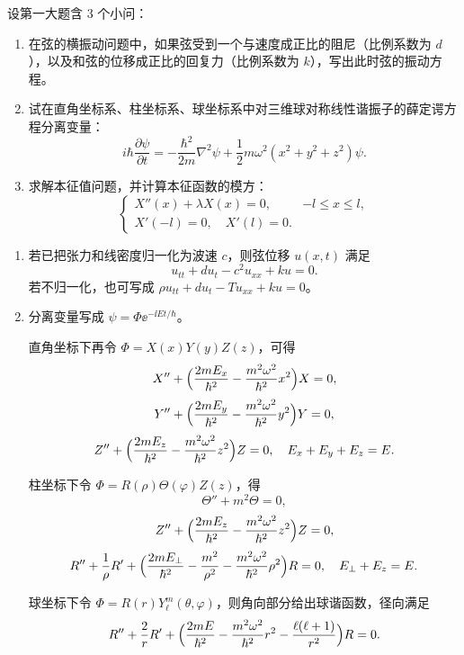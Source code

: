 ﻿

\begin{question}[简单计算和回答]

设第一大题含 3 个小问：
\begin{enumerate}[label=(\arabic*),leftmargin=2.6em,itemsep=0.25em,topsep=0.2em]
\item 在弦的横振动问题中，如果弦受到一个与速度成正比的阻尼（比例系数为 $d$），以及和弦的位移成正比的回复力（比例系数为 $k$），写出此时弦的振动方程。
\item 试在直角坐标系、柱坐标系、球坐标系中对三维球对称线性谐振子的薛定谔方程分离变量：
\[
 i\hbar\frac{\partial \psi}{\partial t}=-\frac{\hbar^2}{2m}\nabla^2\psi+\frac12 m\omega^2(x^2+y^2+z^2)\psi.
\]
\item 求解本征值问题，并计算本征函数的模方：
\[
\begin{cases}
X''(x)+\lambda X(x)=0, & -l\le x\le l,\\
X'(-l)=0,\quad X'(l)=0.
\end{cases}
\]
\end{enumerate}

\begin{solution}

\begin{enumerate}[label=(\arabic*),leftmargin=2.6em,itemsep=0.25em,topsep=0.2em]
\item 若已把张力和线密度归一化为波速 $c$，则弦位移 $u(x,t)$ 满足
\[
 u_{tt}+d u_t-c^2u_{xx}+ku=0.
\]
若不归一化，也可写成 $\rho u_{tt}+d u_t-Tu_{xx}+ku=0$。

\item 分离变量写成 $\psi=\Phi \ee^{-\ii Et/\hbar}$。

直角坐标下再令 $\Phi=X(x)Y(y)Z(z)$，可得
\[
X''+\Bigl(\frac{2mE_x}{\hbar^2}-\frac{m^2\omega^2}{\hbar^2}x^2\Bigr)X=0,
\]
\[
Y''+\Bigl(\frac{2mE_y}{\hbar^2}-\frac{m^2\omega^2}{\hbar^2}y^2\Bigr)Y=0,
\]
\[
Z''+\Bigl(\frac{2mE_z}{\hbar^2}-\frac{m^2\omega^2}{\hbar^2}z^2\Bigr)Z=0,
\quad E_x+E_y+E_z=E.
\]

柱坐标下令 $\Phi=R(\rho)\Theta(\varphi)Z(z)$，得
\[
\Theta''+m^2\Theta=0,
\]
\[
Z''+\Bigl(\frac{2mE_z}{\hbar^2}-\frac{m^2\omega^2}{\hbar^2}z^2\Bigr)Z=0,
\]
\[
R''+\frac1\rho R'+\Bigl(\frac{2mE_\perp}{\hbar^2}-\frac{m^2}{\rho^2}-\frac{m^2\omega^2}{\hbar^2}\rho^2\Bigr)R=0,
\quad E_\perp+E_z=E.
\]

球坐标下令 $\Phi=R(r)Y_{\ell}^{m}(\theta,\varphi)$，则角向部分给出球谐函数，径向满足
\[
R''+\frac{2}{r}R'+\Bigl(\frac{2mE}{\hbar^2}-\frac{m^2\omega^2}{\hbar^2}r^2-\frac{\ell(\ell+1)}{r^2}\Bigr)R=0.
\]


\end{enumerate}
\end{solution}
\end{question}
